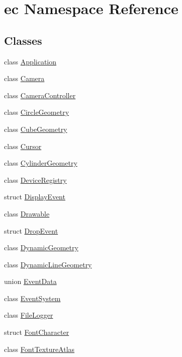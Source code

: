 \hypertarget{namespaceec}{}\section{ec Namespace Reference}
\label{namespaceec}
\subsection*{Classes}
\begin{DoxyCompactItemize}
\item 
class \mbox{\hyperlink{classec_1_1_application}{Application}}
\item 
class \mbox{\hyperlink{classec_1_1_camera}{Camera}}
\item 
class \mbox{\hyperlink{classec_1_1_camera_controller}{Camera\+Controller}}
\item 
class \mbox{\hyperlink{classec_1_1_circle_geometry}{Circle\+Geometry}}
\item 
class \mbox{\hyperlink{classec_1_1_cube_geometry}{Cube\+Geometry}}
\item 
class \mbox{\hyperlink{classec_1_1_cursor}{Cursor}}
\item 
class \mbox{\hyperlink{classec_1_1_cylinder_geometry}{Cylinder\+Geometry}}
\item 
class \mbox{\hyperlink{classec_1_1_device_registry}{Device\+Registry}}
\item 
struct \mbox{\hyperlink{structec_1_1_display_event}{Display\+Event}}
\item 
class \mbox{\hyperlink{classec_1_1_drawable}{Drawable}}
\item 
struct \mbox{\hyperlink{structec_1_1_drop_event}{Drop\+Event}}
\item 
class \mbox{\hyperlink{classec_1_1_dynamic_geometry}{Dynamic\+Geometry}}
\item 
class \mbox{\hyperlink{classec_1_1_dynamic_line_geometry}{Dynamic\+Line\+Geometry}}
\item 
union \mbox{\hyperlink{unionec_1_1_event_data}{Event\+Data}}
\item 
class \mbox{\hyperlink{classec_1_1_event_system}{Event\+System}}
\item 
class \mbox{\hyperlink{classec_1_1_file_logger}{File\+Logger}}
\item 
struct \mbox{\hyperlink{structec_1_1_font_character}{Font\+Character}}
\item 
class \mbox{\hyperlink{classec_1_1_font_texture_atlas}{Font\+Texture\+Atlas}}
\item 

\end{DoxyCompactItemize}
